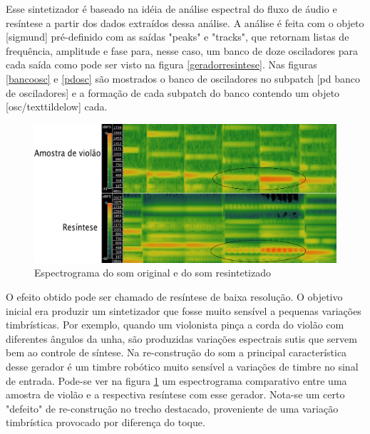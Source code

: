 \documentclass{ppgmus}
\begin{document}
Esse sintetizador é baseado na idéia de análise espectral do fluxo
de áudio e resíntese a partir dos dados extraídos dessa análise.
A análise é feita com o objeto [sigmund\texttildelow] pré-definido com
as saídas "peaks" e "tracks", que retornam listas de frequência, amplitude e 
fase para, nesse caso, um banco de doze osciladores para cada saída como pode 
ser visto na figura \ref{geradorresintese}.
Nas figuras \ref{bancoosc} e \ref{pdosc} são mostrados o banco de osciladores no subpatch
[pd banco de osciladores] e a formação de cada subpatch do banco contendo um objeto [osc/texttildelow]
cada. 


\begin{figure}
\includegraphics[scale=.5]{spectro}
\caption{Espectrograma do som original e do som resintetizado}
\label{spectro}
\end{figure}
 
O efeito obtido pode ser chamado de resíntese de baixa resolução. O objetivo
inicial era produzir um sintetizador que fosse muito sensível a pequenas
variações timbrísticas. Por exemplo, quando um violonista pinça a corda do violão
com diferentes ângulos da unha, são produzidas variações espectrais sutis que servem
bem ao controle de síntese. Na re-construção do som a principal característica desse
gerador é um timbre robótico muito sensível a variações de timbre no sinal de entrada.
Pode-se ver na figura \ref{spectro} um espectrograma comparativo entre uma amostra
de violão e a respectiva resíntese com esse gerador. Nota-se um certo "defeito"
de re-construção no trecho destacado, proveniente de uma variação timbrística provocado
por diferença do toque. 




\pagebreak
\end{document}
